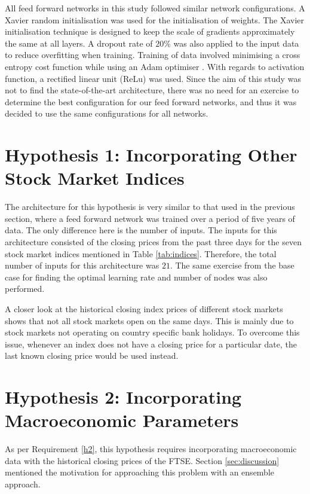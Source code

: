 \documentclass{UoYCSproject}
\begin{document}
All feed forward networks in this study followed similar network configurations. A Xavier \cite{glorot2010understanding} random initialisation was used for the initialisation of weights. The Xavier initialisation technique is designed to keep the scale of gradients approximately the same at all layers. A dropout rate of $20$\% was also applied to the input data to reduce overfitting when training. Training of data involved minimising a cross entropy cost function while using an Adam optimiser \cite{kingma2014adam}. With regards to activation function, a rectified linear unit (ReLu) was used. Since the aim of this study was not to find the state-of-the-art architecture, there was no need for an exercise to determine the best configuration for our feed forward networks, and thus it was decided to use the same configurations for all networks. 

\section{Hypothesis 1: Incorporating Other Stock Market Indices}
\label{sec:methodh1}
The architecture for this hypothesis is very similar to that used in the previous section, where a feed forward network was trained over a period of five years of data. The only difference here is the number of inputs. The inputs for this architecture consisted of the closing prices from the past three days for the seven stock market indices mentioned in Table \ref{tab:indices}. Therefore, the total number of inputs for this architecture was $21$. The same exercise from the base case for finding the optimal learning rate and number of nodes was also performed. 

A closer look at the historical closing index prices of different stock markets shows that not all stock markets open on the same days. This is mainly due to stock markets not operating on country specific bank holidays. To overcome this issue, whenever an index does not have a closing price for a particular date, the last known closing price would be used instead.  

\section{Hypothesis 2: Incorporating Macroeconomic Parameters}
\label{sec:methodh2}
As per Requirement \ref{h2}, this hypothesis requires incorporating macroeconomic data with the historical closing prices of the FTSE. Section \ref{sec:discussion} mentioned the motivation for approaching this problem with an ensemble approach. 
\end{document}
